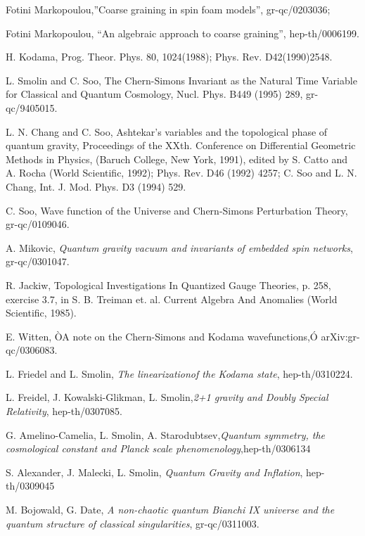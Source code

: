 \documentclass[12pt]{article}
\begin{document}
\begin{thebibliography}{0}
{{{Fotini Markopoulou,''Coarse graining in spin foam models'',
gr-qc/0203036;

Fotini Markopoulou, ``An algebraic approach
to coarse graining'', hep-th/0006199.

H. Kodama, Prog. Theor. Phys. 80, 1024(1988);
Phys. Rev. D42(1990)2548.

L. Smolin and C. Soo, The
Chern-Simons Invariant as the Natural Time Variable for
Classical and Quantum Cosmology, Nucl. Phys. B449 (1995) 289, gr-qc/9405015.

L. N. Chang and C. Soo,
Ashtekar's variables and the topological phase of quantum gravity,
Proceedings of the XXth.
Conference on Differential Geometric Methods in Physics, (Baruch College,
New York, 1991), edited by S. Catto and A.
Rocha (World Scientific, 1992); Phys. Rev. D46 (1992) 4257;
C. Soo and L. N. Chang, Int. J. Mod. Phys. D3 (1994) 529.

C. Soo, Wave function of the Universe
and Chern-Simons Perturbation Theory, gr-qc/0109046.

A. Mikovic,  
{\it Quantum gravity vacuum and invariants of embedded spin networks},
gr-qc/0301047.

R. Jackiw, Topological Investigations In Quantized Gauge 
Theories, p. 258, exercise 3.7, in S. B. Treiman et. al.  Current Algebra And Anomalies (World Scientific, 1985).

E. Witten, ÒA note on the Chern-Simons and Kodama wavefunctions,Ó arXiv:gr-qc/0306083.

L. Friedel and L. Smolin, {\it The linearizationof the Kodama state},  
hep-th/0310224.

L. Freidel, J. Kowalski-Glikman, L. Smolin,{\it 2+1 gravity and Doubly Special Relativity}, hep-th/0307085.

G. Amelino-Camelia, L. Smolin, A. Starodubtsev,{\it Quantum symmetry, the cosmological constant and Planck scale phenomenology},hep-th/0306134  



S. Alexander, J. Malecki, L.  Smolin, {\it Quantum Gravity and Inflation}, hep-th/0309045     



M.  Bojowald, G.  Date, 
    {\it  A non-chaotic quantum Bianchi IX universe and the quantum structure of classical singularities}, gr-qc/0311003.

}}}
\end{thebibliography}
\end{document}

